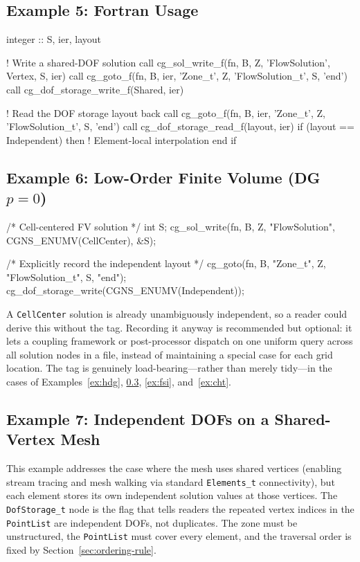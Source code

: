 \documentclass[11pt,letterpaper]{article}
\makeatletter
\let\cgns@orig@lstlisting\lstlisting
\let\cgns@endorig@lstlisting\endlstlisting
\renewenvironment{lstlisting}
  {\par\needspace{5\baselineskip}\nolinenumbers\cgns@orig@lstlisting}
  {\cgns@endorig@lstlisting\par\linenumbers}
\makeatother
\begin{document}
\subsection{Example 5: Fortran Usage}
\label{ex:fortran}

\begin{lstlisting}[language=Fortran]
integer :: S, ier, layout

! Write a shared-DOF solution
call cg_sol_write_f(fn, B, Z, 'FlowSolution', Vertex, S, ier)
call cg_goto_f(fn, B, ier, 'Zone_t', Z, 'FlowSolution_t', S, 'end')
call cg_dof_storage_write_f(Shared, ier)

! Read the DOF storage layout back
call cg_goto_f(fn, B, ier, 'Zone_t', Z, 'FlowSolution_t', S, 'end')
call cg_dof_storage_read_f(layout, ier)
if (layout == Independent) then
    ! Element-local interpolation
end if
\end{lstlisting}

\subsection{Example 6: Low-Order Finite Volume
  (\texorpdfstring{DG $p=0$}{DG p=0})}
\label{ex:fv}

\begin{lstlisting}[language=C]
/* Cell-centered FV solution */
int S;
cg_sol_write(fn, B, Z, "FlowSolution",
    CGNS_ENUMV(CellCenter), &S);

/* Explicitly record the independent layout */
cg_goto(fn, B, "Zone_t", Z, "FlowSolution_t", S, "end");
cg_dof_storage_write(CGNS_ENUMV(Independent));
\end{lstlisting}

A \texttt{CellCenter} solution is already unambiguously independent, so
a reader could derive this without the tag.  Recording it anyway is
recommended but optional: it lets a coupling framework or
post-processor dispatch on one uniform query across all solution nodes
in a file, instead of maintaining a special case for each grid
location.  The tag is genuinely load-bearing---rather than merely
tidy---in the cases of Examples~\ref{ex:hdg},
\ref{ex:shared-vertex-dg}, \ref{ex:fsi}, and~\ref{ex:cht}.

\subsection{Example 7: Independent DOFs on a Shared-Vertex Mesh}
\label{ex:shared-vertex-dg}

This example addresses the case where the mesh uses shared vertices
(enabling stream tracing and mesh walking via standard
\texttt{Elements\_t} connectivity), but each element stores its own
independent solution values at those vertices.  The
\texttt{DofStorage\_t} node is the flag that tells readers
the repeated vertex indices in the \texttt{PointList} are independent
DOFs, not duplicates.  The zone must be unstructured, the
\texttt{PointList} must cover every element, and the traversal order is
fixed by Section~\ref{sec:ordering-rule}.
\end{document}
